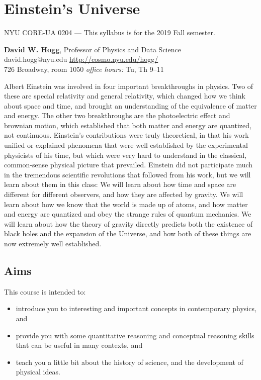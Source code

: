 \documentclass[12pt]{article}
\begin{document}
\sloppy\sloppypar\raggedbottom\frenchspacing

\section*{Einstein's Universe}
NYU CORE-UA 0204 --- This syllabus is for the 2019 Fall semester.

\bigskip
\noindent
\textbf{David W. Hogg}, Professor of Physics and Data Science \\
david.hogg@nyu.edu \hfill \url{http://cosmo.nyu.edu/hogg/} \\
726 Broadway, room 1050 \hfill \textsl{office hours:} Tu, Th 9--11

\bigskip
\noindent
Albert Einstein was involved in four important breakthroughs in
physics.
Two of these are special relativity and general relativity, which
changed how we think about space and time, and brought an
understanding of the equivalence of matter and energy.
The other two breakthroughs are the photoelectric effect and brownian
motion, which established that both matter and energy are quantized,
not continuous.
Einstein's contributions were truly theoretical, in that his work
unified or explained phenomena that were well established by the
experimental physicists of his time, but which were very hard to
understand in the classical, common-sense physical picture that
prevailed.
Einstein did not participate much in the tremendous scientific
revolutions that followed from his work, but we will learn about
them in this class:
We will learn about how time and space are different for different
observers, and how they are affected by gravity.
We will learn about how we know that the world is made up of atoms,
and how matter and energy are quantized and obey the strange rules of
quantum mechanics.
We will learn about how the theory of gravity directly predicts both
the existence of black holes and the expansion of the Universe, and
how both of these things are now extremely well established.

\subsection*{Aims}

This course is intended to:
\begin{itemize}
\item
introduce you to interesting and important concepts in contemporary
physics, and
\item
provide you with some quantitative reasoning and conceptual
reasoning skills that can be useful in many contexts, and
\item
teach you a little bit about the history of science,
and the development of physical ideas.
\end{itemize}
\end{document}
